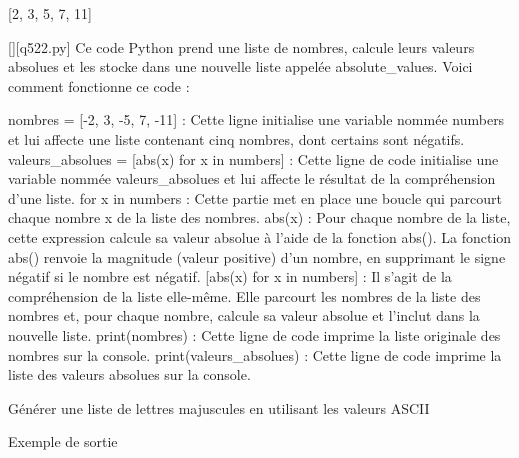 [2, 3, 5, 7, 11]
        \par
        \begin{solution}
            \renewcommand{\nomfichier}{q522.py}
            \pythonfile{\chemincode \nomfichier}[][\nomfichier]
            Ce code Python prend une liste de nombres, calcule leurs valeurs absolues et les stocke dans une nouvelle liste appelée absolute_values. Voici comment fonctionne ce code :

    nombres = [-2, 3, -5, 7, -11] : Cette ligne initialise une variable nommée numbers et lui affecte une liste contenant cinq nombres, dont certains sont négatifs.
    valeurs_absolues = [abs(x) for x in numbers] : Cette ligne de code initialise une variable nommée valeurs_absolues et lui affecte le résultat de la compréhension d'une liste.
        for x in numbers : Cette partie met en place une boucle qui parcourt chaque nombre x de la liste des nombres.
        abs(x) : Pour chaque nombre de la liste, cette expression calcule sa valeur absolue à l'aide de la fonction abs(). La fonction abs() renvoie la magnitude (valeur positive) d'un nombre, en supprimant le signe négatif si le nombre est négatif.
        [abs(x) for x in numbers] : Il s'agit de la compréhension de la liste elle-même. Elle parcourt les nombres de la liste des nombres et, pour chaque nombre, calcule sa valeur absolue et l'inclut dans la nouvelle liste.
    print(nombres) : Cette ligne de code imprime la liste originale des nombres sur la console.
    print(valeurs_absolues) : Cette ligne de code imprime la liste des valeurs absolues sur la console.
        \end{solution}
        

        \question
        Générer une liste de lettres majuscules en utilisant les valeurs ASCII

Exemple de sortie

